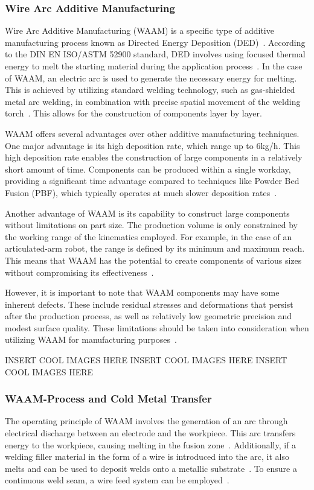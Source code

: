 \subsubsection{Wire Arc Additive Manufacturing}
Wire Arc Additive Manufacturing (WAAM) is a specific type of additive manufacturing process known as Directed Energy Deposition (DED)~\cite{Svetlizky.2021}. According to the DIN EN ISO/ASTM 52900 standard, DED involves using focused thermal energy to melt the starting material during the application process~\cite{Additive}. In the case of WAAM, an electric arc is used to generate the necessary energy for melting. This is achieved by utilizing standard welding technology, such as gas-shielded metal arc welding, in combination with precise spatial movement of the welding torch~\cite{Cunningham.2018}. This allows for the construction of components layer by layer.

WAAM offers several advantages over other additive manufacturing techniques. One major advantage is its high deposition rate, which range up to 6kg/h. This high deposition rate enables the construction of large components in a relatively short amount of time. Components can be produced within a single workday, providing a significant time advantage compared to techniques like Powder Bed Fusion (PBF), which typically operates at much slower deposition rates~\cite{IvanTabernero.2018}.

Another advantage of WAAM is its capability to construct large components without limitations on part size. The production volume is only constrained by the working range of the kinematics employed. For example, in the case of an articulated-arm robot, the range is defined by its minimum and maximum reach. This means that WAAM has the potential to create components of various sizes without compromising its effectiveness~\cite{Li.2019}.

However, it is important to note that WAAM components may have some inherent defects. These include residual stresses and deformations that persist after the production process, as well as relatively low geometric precision and modest surface quality. These limitations should be taken into consideration when utilizing WAAM for manufacturing purposes~\cite{Wu.2018}.

INSERT COOL IMAGES HERE\newline
INSERT COOL IMAGES HERE\newline
INSERT COOL IMAGES HERE\newline

\subsubsection{WAAM-Process and Cold Metal Transfer}
The operating principle of WAAM involves the generation of an arc through electrical discharge between an electrode and the workpiece. This arc transfers energy to the workpiece, causing melting in the fusion zone~\cite{Ou.2018}. Additionally, if a welding filler material in the form of a wire is introduced into the arc, it also melts and can be used to deposit welds onto a metallic substrate~\cite{Cunningham.2018}. To ensure a continuous weld seam, a wire feed system can be employed~\cite{Ding.2015}.

